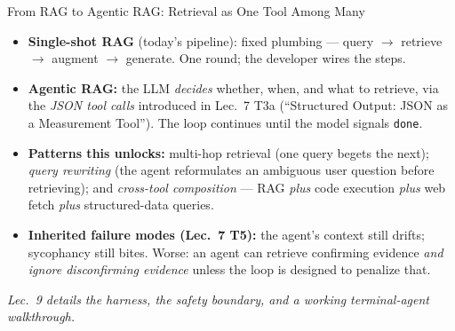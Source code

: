 \begin{frame}{From RAG to Agentic RAG: Retrieval as One Tool Among Many}
\begin{itemize}\small
\item \textbf{Single-shot RAG} (today's pipeline): fixed plumbing --- query $\to$ retrieve $\to$ augment $\to$ generate. One round; the developer wires the steps.

\medskip
\item \textbf{Agentic RAG:} the LLM \emph{decides} whether, when, and what to retrieve, via the \emph{JSON tool calls} introduced in Lec.\ 7 T3a (``Structured Output: JSON as a Measurement Tool''). The loop continues until the model signals \texttt{done}.

\medskip
\item \textbf{Patterns this unlocks:} multi-hop retrieval (one query begets the next); \emph{query rewriting} (the agent reformulates an ambiguous user question before retrieving); and \emph{cross-tool composition} --- RAG \emph{plus} code execution \emph{plus} web fetch \emph{plus} structured-data queries.

\medskip
\item \textbf{Inherited failure modes (Lec.\ 7 T5):} the agent's context still drifts; sycophancy still bites. Worse: an agent can retrieve confirming evidence \emph{and ignore disconfirming evidence} unless the loop is designed to penalize that.
\end{itemize}

\vspace{-0.1cm}
\begin{center}
\end{center}

\vspace{-0.1cm}
\centering\textit{Lec.\ 9 details the harness, the safety boundary, and a working terminal-agent walkthrough.}
\end{frame}

